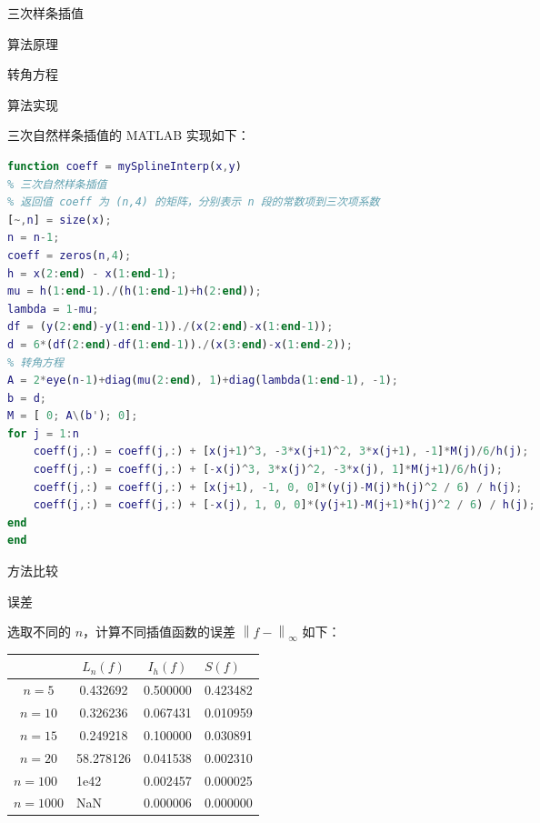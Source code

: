 \documentclass[a4paper]{article}
\begin{document}
\begin{multicols}{2}
\begin{section}{三次样条插值}
\begin{subsection}{算法原理}
\begin{subsubsection}{转角方程}
		\end{subsubsection}
		
	\end{subsection}

	\begin{subsection}{算法实现}
		
		三次自然样条插值的 MATLAB 实现如下：
		
		\begin{lstlisting}[language=Matlab]
function coeff = mySplineInterp(x,y)
% 三次自然样条插值
% 返回值 coeff 为 (n,4) 的矩阵，分别表示 n 段的常数项到三次项系数
[~,n] = size(x);
n = n-1;
coeff = zeros(n,4);
h = x(2:end) - x(1:end-1);
mu = h(1:end-1)./(h(1:end-1)+h(2:end));
lambda = 1-mu;
df = (y(2:end)-y(1:end-1))./(x(2:end)-x(1:end-1));
d = 6*(df(2:end)-df(1:end-1))./(x(3:end)-x(1:end-2));
% 转角方程
A = 2*eye(n-1)+diag(mu(2:end), 1)+diag(lambda(1:end-1), -1);
b = d;
M = [ 0; A\(b'); 0];
for j = 1:n
    coeff(j,:) = coeff(j,:) + [x(j+1)^3, -3*x(j+1)^2, 3*x(j+1), -1]*M(j)/6/h(j);
    coeff(j,:) = coeff(j,:) + [-x(j)^3, 3*x(j)^2, -3*x(j), 1]*M(j+1)/6/h(j);
    coeff(j,:) = coeff(j,:) + [x(j+1), -1, 0, 0]*(y(j)-M(j)*h(j)^2 / 6) / h(j);
    coeff(j,:) = coeff(j,:) + [-x(j), 1, 0, 0]*(y(j+1)-M(j+1)*h(j)^2 / 6) / h(j);
end
end
		\end{lstlisting}
		
	\end{subsection}
	
\end{section}

\begin{section}{方法比较}
	
	\begin{subsection}{误差}
	
		选取不同的 $n$，计算不同插值函数的误差 $\left\|f-\right\|_{\infty}$  如下：
		
		\begin{table}[H]
		\begin{tabular}{c|c|c|l}
		\hline
		                              &  $L_{n}(f)$              & $I_h(f)$                        & $S(f)$   \\ \hline
		$n=5$                         & 0.432692                  & 0.500000                      & 0.423482 \\
		$n=10$                        & 0.326236                  & 0.067431                      & 0.010959 \\
		$n=15$                        & 0.249218                  & 0.100000                      & 0.030891 \\
		$n=20$                        & 58.278126                 & 0.041538                      & 0.002310 \\
		\multicolumn{1}{l|}{$n=100$}  & \multicolumn{1}{l|}{1e42} & \multicolumn{1}{l|}{0.002457} & 0.000025 \\
		\multicolumn{1}{l|}{$n=1000$} & \multicolumn{1}{l|}{NaN}  & \multicolumn{1}{l|}{0.000006} & 0.000000 \\ \hline
		\end{tabular}
		\end{table}	
		

\end{subsection}
\end{section}
\end{multicols}
\end{document}
